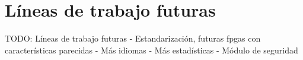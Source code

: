 \chapter{Líneas de trabajo futuras\label{cap:lineas_de_trabajo_futuras}}

TODO: Líneas de trabajo futuras
  - Estandarización, futuras fpgas con características parecidas
  - Más idiomas
  - Más estadísticas
  - Módulo de seguridad
